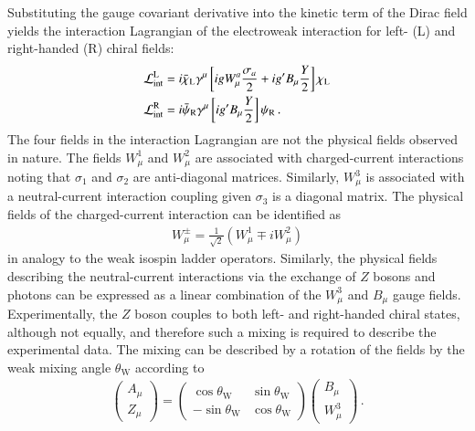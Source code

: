 Substituting the gauge covariant derivative into the kinetic term of the Dirac
field yields the interaction Lagrangian of the electroweak interaction for left-
(L) and right-handed (R) chiral fields:
\begin{align}
  &\mathcal{L}_{\text{int}}^{\text{L}} = i \bar{\chi}_{\text{L}} \gamma^\mu \left[i g W_\mu^a \frac{\sigma_a}{2} + i g^\prime B_\mu \frac{Y}{2} \right] \chi_{\text{L}} \label{eq:theory_electroweak_left} \\
  &\mathcal{L}_{\text{int}}^{\text{R}} = i \bar{\psi}_{\text{R}} \gamma^\mu \left[i g^\prime B_\mu \frac{Y}{2} \right] \psi_{\text{R}} \,\text{.} \label{eq:theory_electroweak_right}
\end{align}
The four fields in the interaction Lagrangian are not the physical fields
observed in nature. The fields $W_\mu^1$ and $W_\mu^2$ are associated with
charged-current interactions noting that $\sigma_1$ and $\sigma_2$ are
anti-diagonal matrices. Similarly, $W_\mu^3$ is associated with a
neutral-current interaction coupling given $\sigma_3$ is a diagonal matrix.  The
physical fields of the charged-current interaction can be identified as
\begin{align*}
  W_\mu^\pm = \frac{1}{\sqrt{2}} (W_\mu^1 \mp i W_\mu^2)
\end{align*}
in analogy to the weak isospin ladder operators. Similarly, the physical fields
describing the neutral-current interactions via the exchange of $Z$ bosons and
photons can be expressed as a linear combination of the $W_\mu^3$ and $B_\mu$
gauge fields. Experimentally, the $Z$ boson couples to both left- and
right-handed chiral states, although not equally, and therefore such a mixing is
required to describe the experimental data. The mixing can be described by a
rotation of the fields by the weak mixing angle $\theta_{\text{W}}$ according to
\begin{align*}
  \begin{pmatrix}
    A_\mu \\
    Z_\mu
  \end{pmatrix}
  =
  \begin{pmatrix}
    \cos\theta_{\text{W}} & \sin\theta_{\text{W}} \\
    -\sin\theta_{\text{W}} & \cos\theta_{\text{W}}
  \end{pmatrix}
  \begin{pmatrix}
    B_\mu \\
    W_\mu^3
  \end{pmatrix} \,\text{.}
\end{align*}
